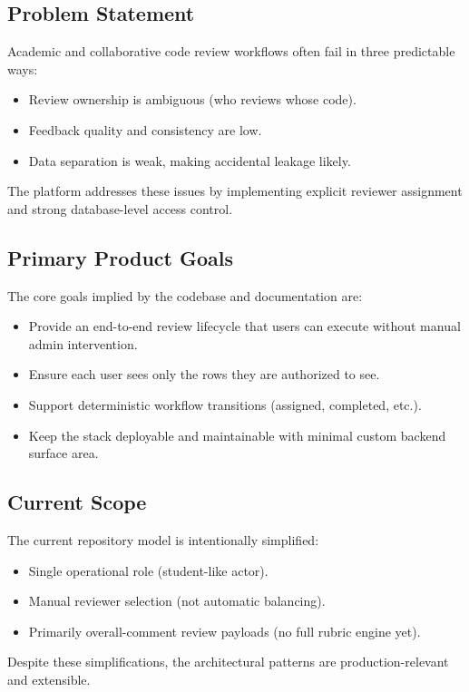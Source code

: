 \documentclass[11pt]{article}
\begin{document}
\subsection{Problem Statement}
Academic and collaborative code review workflows often fail in three predictable ways:
\begin{itemize}[leftmargin=*]
  \item Review ownership is ambiguous (who reviews whose code).
  \item Feedback quality and consistency are low.
  \item Data separation is weak, making accidental leakage likely.
\end{itemize}

The platform addresses these issues by implementing explicit reviewer assignment and strong database-level access control.

\subsection{Primary Product Goals}
The core goals implied by the codebase and documentation are:
\begin{itemize}[leftmargin=*]
  \item Provide an end-to-end review lifecycle that users can execute without manual admin intervention.
  \item Ensure each user sees only the rows they are authorized to see.
  \item Support deterministic workflow transitions (assigned, completed, etc.).
  \item Keep the stack deployable and maintainable with minimal custom backend surface area.
\end{itemize}

\subsection{Current Scope}
The current repository model is intentionally simplified:
\begin{itemize}[leftmargin=*]
  \item Single operational role (student-like actor).
  \item Manual reviewer selection (not automatic balancing).
  \item Primarily overall-comment review payloads (no full rubric engine yet).
\end{itemize}

Despite these simplifications, the architectural patterns are production-relevant and extensible.
\end{document}

